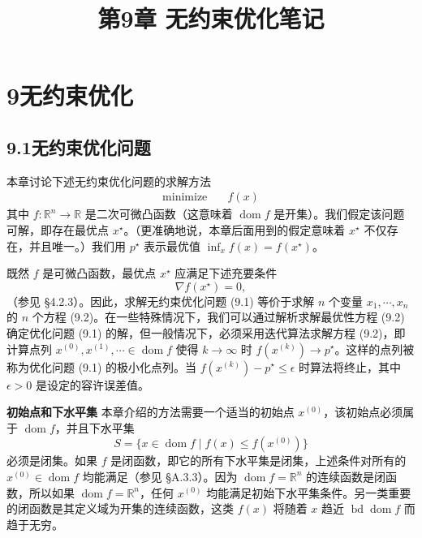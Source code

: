 \documentclass[UTF8,12pt,a4paper,fontset=fandol]{ctexart}
\title{第9章 无约束优化笔记}
\author{}
\date{}
\begin{document}
\maketitle

\section*{9\quad 无约束优化}

\subsection*{9.1\quad 无约束优化问题}

本章讨论下述无约束优化问题的求解方法
\begin{equation}
\begin{aligned}
\text{minimize}\quad & f(x)
\end{aligned}
\tag{9.1}
\end{equation}
其中 $f:\mathbb{R}^n\to\mathbb{R}$ 是二次可微凸函数（这意味着 $\operatorname{dom} f$ 是开集）。我们假定该问题可解，即存在最优点 $x^\star$。（更准确地说，本章后面用到的假定意味着 $x^\star$ 不仅存在，并且唯一。）我们用 $p^\star$ 表示最优值 $\inf_x f(x)=f(x^\star)$。

既然 $f$ 是可微凸函数，最优点 $x^\star$ 应满足下述充要条件
\begin{equation}
\nabla f(x^\star)=0,
\tag{9.2}
\end{equation}
（参见 \S4.2.3）。因此，求解无约束优化问题 (9.1) 等价于求解 $n$ 个变量 $x_1,\cdots,x_n$ 的 $n$ 个方程 (9.2)。在一些特殊情况下，我们可以通过解析求解最优性方程 (9.2) 确定优化问题 (9.1) 的解，但一般情况下，必须采用迭代算法求解方程 (9.2)，即计算点列 $x^{(0)},x^{(1)},\cdots\in\operatorname{dom} f$ 使得 $k\to\infty$ 时 $f(x^{(k)})\to p^\star$。这样的点列被称为优化问题 (9.1) 的极小化点列。当 $f(x^{(k)})-p^\star\leq \epsilon$ 时算法将终止，其中 $\epsilon>0$ 是设定的容许误差值。

\noindent\textbf{初始点和下水平集}\quad
本章介绍的方法需要一个适当的初始点 $x^{(0)}$，该初始点必须属于 $\operatorname{dom} f$，并且下水平集
\begin{equation}
S=\{x\in\operatorname{dom} f\mid f(x)\leq f(x^{(0)})\}
\tag{9.3}
\end{equation}
必须是闭集。如果 $f$ 是闭函数，即它的所有下水平集是闭集，上述条件对所有的 $x^{(0)}\in\operatorname{dom} f$ 均能满足（参见 \S A.3.3）。因为 $\operatorname{dom} f=\mathbb{R}^n$ 的连续函数是闭函数，所以如果 $\operatorname{dom} f=\mathbb{R}^n$，任何 $x^{(0)}$ 均能满足初始下水平集条件。另一类重要的闭函数是其定义域为开集的连续函数，这类 $f(x)$ 将随着 $x$ 趋近 $\operatorname{bd}\operatorname{dom} f$ 而趋于无穷。
\end{document}
